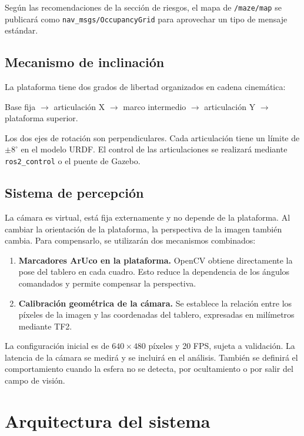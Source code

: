 \documentclass[11pt,a4paper]{article}
\begin{document}
Según las recomendaciones de la sección de riesgos, el mapa de \texttt{/maze/map} se publicará como \texttt{nav\_msgs/OccupancyGrid} para aprovechar un tipo de mensaje estándar.

\subsection{Mecanismo de inclinación}
La plataforma tiene dos grados de libertad organizados en cadena cinemática:
\begin{center}
    Base fija $\rightarrow$ articulación X $\rightarrow$ marco intermedio $\rightarrow$ articulación Y $\rightarrow$ plataforma superior.
\end{center}
Los dos ejes de rotación son perpendiculares. Cada articulación tiene un límite de $\pm 8^\circ$ en el modelo URDF. El control de las articulaciones se realizará mediante \texttt{ros2\_control} o el puente de Gazebo.

\subsection{Sistema de percepción}
La cámara es virtual, está fija externamente y no depende de la plataforma. Al cambiar la orientación de la plataforma, la perspectiva de la imagen también cambia. Para compensarlo, se utilizarán dos mecanismos combinados:
\begin{enumerate}
    \item \textbf{Marcadores ArUco en la plataforma.} OpenCV obtiene directamente la pose del tablero en cada cuadro. Esto reduce la dependencia de los ángulos comandados y permite compensar la perspectiva.
    \item \textbf{Calibración geométrica de la cámara.} Se establece la relación entre los píxeles de la imagen y las coordenadas del tablero, expresadas en milímetros mediante TF2.
\end{enumerate}
La configuración inicial es de $640 \times 480$ píxeles y 20 FPS, sujeta a validación. La latencia de la cámara se medirá y se incluirá en el análisis. También se definirá el comportamiento cuando la esfera no se detecta, por ocultamiento o por salir del campo de visión.

\section{Arquitectura del sistema}
\end{document}
